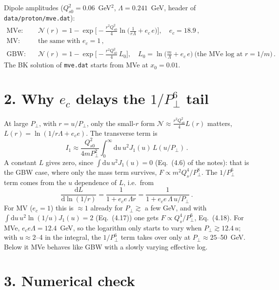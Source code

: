 \documentclass[12pt]{article}
\begin{document}
Dipole amplitudes ($Q_{s0}^2=0.06$~GeV$^2$, $\Lambda=0.241$~GeV, header of \texttt{data/proton/mve.dat}):
\begin{align}
\text{MVe:}\quad&\mathcal{N}(r)=1-\exp\Big[-\frac{r^2Q_{s0}^2}{4}\ln\Big(\frac{1}{r\Lambda}+e_c\,e\Big)\Big],\quad e_c=18.9\,,\\
\text{MV:}\quad&\text{the same with }e_c=1\,,\\
\text{GBW:}\quad&\mathcal{N}(r)=1-\exp\Big[-\frac{r^2Q_{s0}^2}{4}\,L_0\Big],\quad L_0=\ln\Big(\frac{m}{\Lambda}+e_c\,e\Big)
\ \text{(the MVe log at $r=1/m$)}\,.
\end{align}
The BK solution of \texttt{mve.dat} starts from MVe at $x_0=0.01$.

\section*{2. Why $e_c$ delays the $1/P_\perp^6$ tail}

At large $P_\perp$, with $r=u/P_\perp$, only the small-$r$ form $\mathcal{N}\approx\frac{r^2Q_{s0}^2}{4}L(r)$ matters,
$L(r)=\ln(1/r\Lambda+e_c e)$. The transverse term is
\begin{equation}
I_1\approx\frac{Q_{s0}^2}{4mP_\perp^2}\int_0^\infty\!\mathrm{d}u\,u^2J_1(u)\,L(u/P_\perp)\,.
\end{equation}
A constant $L$ gives zero, since $\int\mathrm{d}u\,u^2J_1(u)=0$ (Eq.~(4.6) of the notes): that is the GBW
case, where only the mass term survives, $F\propto m^2Q_s^4/P_\perp^8$. The $1/P_\perp^6$ term comes from the
$u$ dependence of $L$, i.e.\ from
\begin{equation}
\frac{\mathrm{d}L}{\mathrm{d}\ln(1/r)}=\frac{1}{1+e_c e\,\Lambda r}=\frac{1}{1+e_c e\,\Lambda\,u/P_\perp}\,.
\end{equation}
For MV ($e_c=1$) this is $\approx1$ already for $P_\perp\gtrsim$ a few GeV, and with
$\int\mathrm{d}u\,u^2\ln(1/u)J_1(u)=2$ (Eq.~(4.17)) one gets $F\propto Q_s^4/P_\perp^6$, Eq.~(4.18). For MVe,
$e_c e\Lambda=12.4$~GeV, so the logarithm only starts to vary when $P_\perp\gtrsim12.4\,u$; with
$u\approx2$--4 in the integral, the $1/P_\perp^6$ term takes over only at $P_\perp\approx25$--50~GeV. Below it
MVe behaves like GBW with a slowly varying effective log.

\section*{3. Numerical check}
\end{document}
